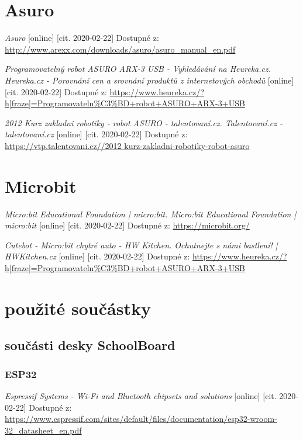 \documentclass{template/socthesis}
\begin{document}
\begin{thebibliography}{1}
	\section{Asuro}
	
	\textit{Asuro} [online] [cit. 2020-02-22] Dostupné z:
	\url{ http://www.arexx.com/downloads/asuro/asuro_manual_en.pdf}
	
	\textit{Programovatelný robot ASURO ARX-3 USB - Vyhledávání na Heureka.cz. Heureka.cz - Porovnání cen a srovnání produktů z internetových obchodů } [online] [cit. 2020-02-22] Dostupné z:
	\url{https://www.heureka.cz/?h[fraze]=Programovateln%C3%BD+robot+ASURO+ARX-3+USB}
		
	\textit{2012 Kurz zakladni robotiky - robot ASURO - talentovaní.cz. Talentovaní.cz - talentovaní.cz} [online] [cit. 2020-02-22] Dostupné z:
	\url{https://vtp.talentovani.cz//2012 kurz-zakladni-robotiky-robot-asuro}
	
	\section{Microbit}
	
	\textit{Micro:bit Educational Foundation | micro:bit. Micro:bit Educational Foundation | micro:bit} [online] [cit. 2020-02-22] Dostupné z:
	\url{https://microbit.org/}
	
	\textit{Cutebot - Micro:bit chytré auto - HW Kitchen. Ochutnejte s námi bastlení! | HWKitchen.cz} [online] [cit. 2020-02-22] Dostupné z:
	\url{https://www.heureka.cz/?h[fraze]=Programovateln%C3%BD+robot+ASURO+ARX-3+USB}
	
	\section{použité součástky}
	
	\subsection{součásti desky SchoolBoard}
	
	\subsubsection{ESP32}
	
	\textit{Espressif Systems - Wi-Fi and Bluetooth chipsets and solutions } [online] [cit. 2020-02-22] Dostupné z:
	\url{https://www.espressif.com/sites/default/files/documentation/esp32-wroom-32_datasheet_en.pdf}
	

\end{thebibliography}
\end{document}

